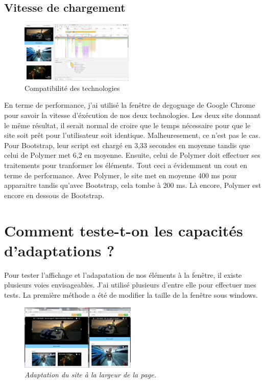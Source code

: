 \documentclass{article}
\begin{document}
\subsection{Vitesse de chargement}

\begin{figure}
  \vspace{-25pt}
  \begin{center}
    \includegraphics[width=0.48\textwidth]{p15}
  \end{center}
  \vspace{-20pt}
  \caption{Compatibilit\'e des technologies}
  \vspace{-10pt}
\end{figure}

En terme de performance, j'ai utilis\'e la fen\^etre de degoguage de Google Chrome pour savoir la vitesse d'\'ex\'ecution de nos deux technologies. Les deux site donnant le m\^eme r\'esultat, il serait normal de croire que le temps n\'ecessaire pour que le site soit pr\^et pour l'utilisateur soit identique. Malheuresement, ce n'est pas le cas. Pour Bootstrap, leur script est charg\'e en 3,33 secondes en moyenne tandis que celui de Polymer met 6,2 en moyenne. Ensuite, celui de Polymer doit effectuer ses traitements pour tranformer les \'el\'ements. Tout ceci a \'evidemment un cout en terme de performance. Avec Polymer, le site met en moyenne 400 ms pour apparaitre tandis qu'avec Bootstrap, cela tombe \`a 200 ms. L\`a encore, Polymer est encore en dessous de Bootstrap.

\newpage
\section{Comment teste-t-on les capacit\'es d'adaptations ?}

\hspace*{0.6cm}Pour tester l'affichage et l'adapatation de nos \'el\'ements \`a la fen\^etre, il existe plusieurs voies envisageables. J'ai utilis\'e plusieurs d'entre elle pour effectuer mes tests. La premi\`ere m\'ethode a \'et\'e de modifier la taille de la fen\^etre sous windows.\\
\begin{figure}
\vspace{-12pt}
\centering
\includegraphics[width=5.5cm]{double}
\caption{\textit{Adaptation du site \`a la largeur de la page.}}
\end{figure} 
\lipsum[1]
\end{document}
